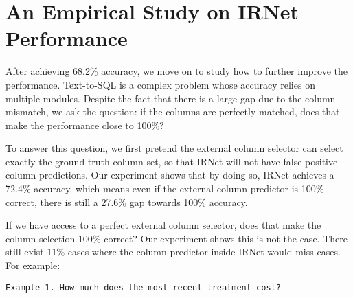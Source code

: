 
\section{An Empirical Study on IRNet Performance}
\label{ch5:sec:study}

After achieving 68.2\% accuracy, we move on to study how to further improve the performance. Text-to-SQL is a complex problem whose accuracy relies on multiple modules. Despite the fact that there is a large gap due to the column mismatch, we ask the question: if the columns are perfectly matched, does that make the performance close to 100\%? 

To answer this question, we first pretend the external column selector can select exactly the ground truth column set, so that IRNet will not have false positive column predictions. Our experiment shows that by doing so, IRNet achieves a 72.4\% accuracy, which means even if the external column predictor is 100\% correct, there is still a 27.6\% gap towards 100\% accuracy. 




If we have access to a perfect external column selector, does that make the column selection 100\% correct? Our experiment shows this is not the case. There still exist 11\% cases where the column predictor inside IRNet would miss cases. For example:

\texttt{Example 1. How much does the most recent treatment cost?}

